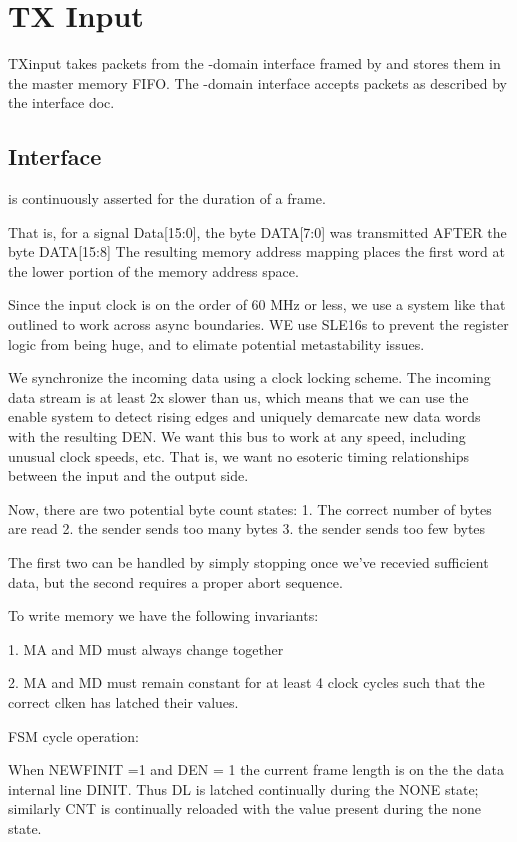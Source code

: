 \section{TX Input}

TXinput takes packets from the -domain interface framed
by  and stores them in the master memory FIFO. The
-domain interface accepts packets as described by the
interface doc.

\subsection{Interface}
 is continuously asserted for the duration of a frame. 

That is, for a signal Data[15:0], the byte DATA[7:0] was transmitted
AFTER the byte DATA[15:8] The resulting memory address mapping places
the first word at the lower portion of the memory address space.

Since the input clock is on the order of 60 MHz or less, we use a
system like that outlined to work across async boundaries. WE use
SLE16s to prevent the register logic from being huge, and to elimate potential metastability issues. 

We synchronize the incoming data using a clock locking scheme. The
incoming data stream is at least 2x slower than us, which means that
we can use the enable system to detect rising edges and uniquely
demarcate new data words with the resulting DEN. We want this bus to
work at any speed, including unusual clock speeds, etc. That is, we
want no esoteric timing relationships between the input and the output
side.

Now, there are two potential byte count states:
1. The correct number of bytes are read
2. the sender sends too many bytes
3. the sender sends too few bytes

The first two can be handled by simply stopping once we've recevied
sufficient data, but the second requires a proper abort sequence.

To write memory we have the following invariants:

1. MA and MD must always change together

2. MA and MD must remain constant for at least 4 clock cycles such
   that the correct clken has latched their values.


FSM cycle operation:

When NEWFINIT =1 and DEN = 1 the current frame length is on the the data internal line DINIT. Thus DL is latched continually during the NONE state; similarly CNT is continually reloaded with the value present during the none state. 

